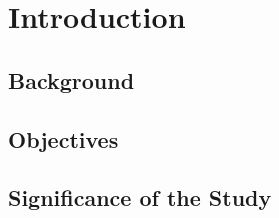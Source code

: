 \chapter{Introduction}



\section{Background}
    
\clearpage

\section{Objectives}
    
\clearpage

\section{Significance of the Study}
    
\clearpage

%       
